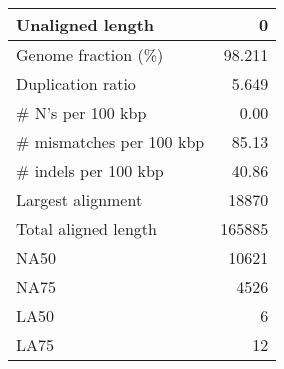 \documentclass[12pt,a4paper]{article}
\begin{document}
\begin{table}[ht]
\begin{center}
\begin{tabular}{|l*{1}{|r}|}
Unaligned length & 0 \\ \hline
Genome fraction (\%) & 98.211 \\ \hline
Duplication ratio & 5.649 \\ \hline
\# N's per 100 kbp & 0.00 \\ \hline
\# mismatches per 100 kbp & 85.13 \\ \hline
\# indels per 100 kbp & 40.86 \\ \hline
Largest alignment & 18870 \\ \hline
Total aligned length & 165885 \\ \hline
NA50 & 10621 \\ \hline
NA75 & 4526 \\ \hline
LA50 & 6 \\ \hline
LA75 & 12 \\ \hline
\end{tabular}
\end{center}
\end{table}
\end{document}
